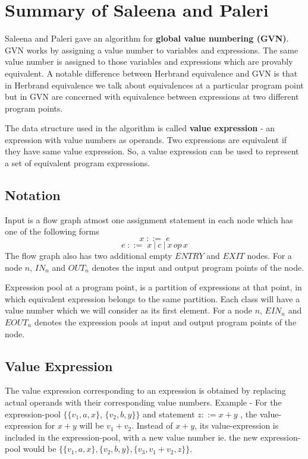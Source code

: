 \chapter{Summary of Saleena and Paleri}
\label{chap:chapter4}

Saleena and Paleri gave an algorithm for 
\textbf{global value numbering (GVN)}. GVN works by assigning a value 
number to variables and expressions. The same value number is 
assigned to those variables and expressions which are provably 
equivalent. A notable difference between Herbrand equivalence and GVN 
is that in Herbrand equivalence we talk about equivalences at a 
particular program point but in GVN are concerned with equivalence 
between expressions at two different program points.

The data structure used in the algorithm is called \textbf{value 
expression} - an expression with value numbers as operands. Two 
expressions are equivalent if they have same value expression. 
So, a value expression can be used to represent a set of equivalent 
program expressions.

\section{Notation}
\label{sec:Notation}
Input is a flow graph atmost one assignment statement in each node
which has one of the following forms
$$x\; ::=\; e$$ 
$$e\; ::=\; x\: |\: c\: |\: x\,op\,x$$
The flow graph also has two additional empty $ENTRY$ and $EXIT$ nodes.
For a node $n$, $IN_n$ and $OUT_n$ denotes the input and output 
program points of the node.

Expression pool at a program point, is a partition of expressions at 
that point, in which equivalent expression belongs to the same 
partition. Each class will have a value number which we will consider 
as its first element. For a node $n$, $EIN_n$ and $EOUT_n$ denotes 
the expression pools at input and output program points of the node.

\section{Value Expression}
\label{sec:ValueExpression}
The value expression corresponding to an expression is obtained by 
replacing actual operands with their corresponding value numbers.
Example - For the expression-pool $\{\{v_1, a, x\}$, $\{v_2, b, y \}\}$ 
and statement $z ::= x + y$ , the value-expression for $x + y$ will be
$v_1 + v_2$. Instead of $x + y$, its value-expression is included in 
the expression-pool, with a new value number ie. the new 
expression-pool would be 
$\{\{v_1, a, x\},\{v_2, b, y\}, \{v_3, v_1 + v_2, z\}\}$.

